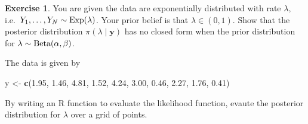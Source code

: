 \documentclass[
]{book}
\newenvironment{Shaded}{\begin{snugshade}}{\end{snugshade}}
\newcommand{\FloatTok}[1]{\textcolor[rgb]{0.00,0.00,0.81}{#1}}
\newcommand{\FunctionTok}[1]{\textcolor[rgb]{0.13,0.29,0.53}{\textbf{#1}}}
\newcommand{\NormalTok}[1]{#1}
\newcommand{\OtherTok}[1]{\textcolor[rgb]{0.56,0.35,0.01}{#1}}
\theoremstyle{definition}
\theoremstyle{definition}
\theoremstyle{definition}
\newtheorem{exercise}{Exercise}[chapter]
\theoremstyle{definition}
\theoremstyle{remark}
\begin{document}
\begin{exercise}

You are given the data are exponentially distributed with rate \(\lambda,\) i.e.~\(Y_1, \ldots, Y_N \sim \hbox{Exp}(\lambda)\). Your prior belief is that \(\lambda \in (0, 1)\). Show that the posterior distribution \(\pi(\lambda \mid \boldsymbol{y})\) has no closed form when the prior distribution for \(\lambda \sim \hbox{Beta}(\alpha, \beta)\).

The data is given by

\begin{Shaded}
\begin{Highlighting}[]
\NormalTok{y }\OtherTok{\textless{}{-}} \FunctionTok{c}\NormalTok{(}\FloatTok{1.95}\NormalTok{, }\FloatTok{1.46}\NormalTok{, }\FloatTok{4.81}\NormalTok{, }\FloatTok{1.52}\NormalTok{, }\FloatTok{4.24}\NormalTok{, }\FloatTok{3.00}\NormalTok{, }\FloatTok{0.46}\NormalTok{, }\FloatTok{2.27}\NormalTok{, }\FloatTok{1.76}\NormalTok{, }\FloatTok{0.41}\NormalTok{)}
\end{Highlighting}
\end{Shaded}

\end{exercise}

By writing an R function to evaluate the likelihood function, evaute the posterior distribution for \(\lambda\) over a grid of points.

  
\end{document}
